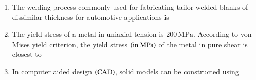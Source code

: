 \documentclass[journal]{IEEEtran}
\begin{document}
\begin{enumerate}[leftmargin=0pt]
\vspace{0.2cm}
\begin{enumerate}
\end{enumerate}
\hfill{}

\item
The welding process commonly used for fabricating tailor-welded blanks of dissimilar thickness for automotive applications is

\vspace{0.2cm}
\begin{enumerate}
\end{enumerate}
\hfill{}

\item
The yield stress of a metal in uniaxial tension is $200\,\text{MPa}$. According to von Mises yield criterion, the yield stress $\left(\text{in MPa}\right)$ of the metal in pure shear is closest to

\vspace{0.2cm}
\begin{enumerate}
\end{enumerate}
\hfill{}

\item
In computer aided design $\left(\text{CAD}\right)$, solid models can be constructed using

\vspace{0.2cm}
\begin{enumerate}
\end{enumerate}
\hfill{}


\end{enumerate}
\end{document}
